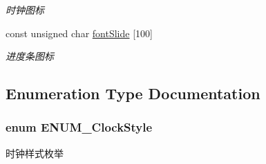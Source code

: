 \begin{DoxyCompactItemize}
\begin{DoxyCompactList}\small\item\em 时钟图标 \end{DoxyCompactList}\item 
\hypertarget{group___w_i_d_g_e_t_gaf4bc560cf5a8012c545d0dd42ad1c8db}{const unsigned char \hyperlink{group___w_i_d_g_e_t_gaf4bc560cf5a8012c545d0dd42ad1c8db}{font\-Slide} \mbox{[}100\mbox{]}}\label{group___w_i_d_g_e_t_gaf4bc560cf5a8012c545d0dd42ad1c8db}

\begin{DoxyCompactList}\small\item\em 进度条图标 \end{DoxyCompactList}\end{DoxyCompactItemize}


\subsection{\-Enumeration \-Type \-Documentation}
\hypertarget{group___w_i_d_g_e_t_ga096d65323cbe1c9a55ddf6566972e0c7}{
\subsubsection[{\-E\-N\-U\-M\-\_\-\-Clock\-Style}]{\setlength{\rightskip}{0pt plus 5cm}enum {\bf \-E\-N\-U\-M\-\_\-\-Clock\-Style}}}\label{group___w_i_d_g_e_t_ga096d65323cbe1c9a55ddf6566972e0c7}


时钟样式枚举 

